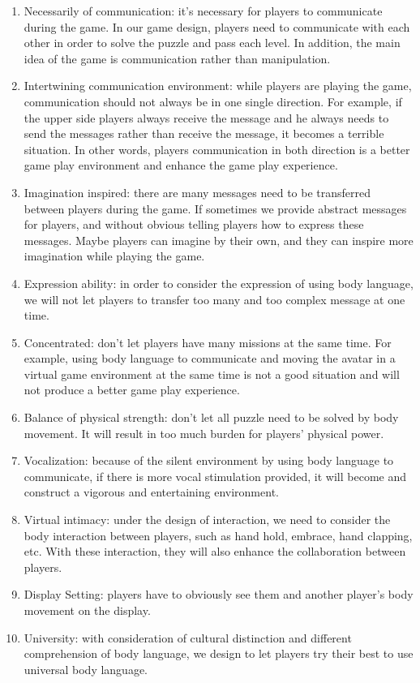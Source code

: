 \documentclass{sigchi}
\begin{document}
\begin{enumerate}
\item Necessarily of communication: 
it's necessary for players to communicate during the game. In our game design, players need to communicate with each other in order to solve the puzzle and pass each level. In addition, the main idea of the game is communication rather than manipulation.
\item Intertwining communication environment: while players are playing the game, communication should not always be in one single direction. For example, if the upper side players always receive the message and he always needs to send the messages rather than receive the message, it becomes a terrible situation. In other words, players communication in both direction is a better game play environment and enhance the game play experience.
\item Imagination inspired:
there are many messages need to be transferred between players during the game. If sometimes we provide abstract messages for players, and without obvious telling players how to express these messages. Maybe players can imagine by their own, and they can inspire more imagination while playing the game.
\item Expression ability:
in order to consider the expression of using body language, we will not let players to transfer too many and too complex message at one time.
\item Concentrated:
don't let players have many missions at the same time. For example, using body language to communicate and moving the avatar in a virtual game environment at the same time is not a good situation and will not produce a better game play experience.
\item Balance of physical strength:
don't let all puzzle need to be solved by body movement. It will result in too much burden for players' physical power.
\item Vocalization: 
because of the silent environment by using body language to communicate, if there is more vocal stimulation provided, it will become and construct a vigorous and entertaining environment.
\item Virtual intimacy:
under the design of interaction, we need to consider the body interaction between players, such as hand hold, embrace, hand clapping, etc. With these interaction, they will also enhance the collaboration between players.
\item Display Setting: 
players have to obviously see them and another player's body movement on the display.
\item University:
with consideration of cultural distinction and different comprehension of body language, we design to let players try their best to use universal body language.

\end{enumerate}
\end{document}
